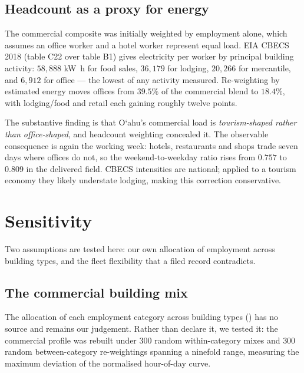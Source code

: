 \documentclass[11pt,a4paper]{article}
\theoremstyle{definition}
\theoremstyle{plain}
\theoremstyle{remark}
\newcommand{\okina}{\textquoteleft}
\newcommand{\Oahu}{O\okina ahu}
\begin{document}
\subsection{Headcount as a proxy for energy}

The commercial composite was initially weighted by employment alone, which
assumes an office worker and a hotel worker represent equal load. EIA CBECS
2018 (table C22 over table B1) gives electricity per worker by principal
building activity: $58{,}888$ \si{\kilo\watt\hour} for food sales, $36{,}179$
for lodging, $20{,}266$ for mercantile, and $6{,}912$ for office --- the lowest
of any activity measured. Re-weighting by estimated energy moves offices from
$39.5\%$ of the commercial blend to $18.4\%$, with lodging/food and retail each
gaining roughly twelve points.

The substantive finding is that \Oahu{}'s commercial load is
\emph{tourism-shaped rather than office-shaped}, and headcount weighting
concealed it. The observable consequence is again the working week: hotels,
restaurants and shops trade seven days where offices do not, so the
weekend-to-weekday ratio rises from $0.757$ to $0.809$ in the delivered field.
CBECS intensities are national; applied to a tourism economy they likely
understate lodging, making this correction conservative.

\section{Sensitivity}
\label{sec:sensitivity}

Two assumptions are tested here: our own allocation of employment across
building types, and the fleet flexibility that a filed record contradicts.

\subsection{The commercial building mix}

The allocation of each employment category across building types
() has no source and remains our judgement. Rather than declare it,
we tested it: the commercial profile was rebuilt under $300$ random
within-category mixes and $300$ random between-category re-weightings spanning
a ninefold range, measuring the maximum deviation of the normalised hour-of-day
curve.
\end{document}
